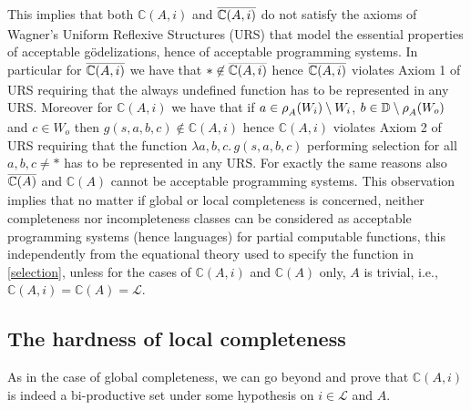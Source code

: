 \documentclass[runningheads]{llncs}
\def\ok#1{\mbox{\raisebox{0ex}[1ex][1ex]{$#1$}}}
\def\bbbc{{\mathbb{C}}}
\newcommand{\ccL}{\mathscr{L}}
\newcommand{\Domain}{\mathbb{D}}
\newcommand{\auco}[2]{\ok{\rho^{#1}_{#2}}}
\newcommand{\compl}[1]{\ok{\overline{#1}}}
\def\ok#1{\mbox{\raisebox{0ex}[1ex][1ex]{$#1$}}}
\def\cAA{\ensuremath{A}}
\begin{document}
This implies that both $\bbbc(\cAA,i)$ and $\compl{\bbbc(\cAA,i)}$ do not satisfy the axioms of Wagner's Uniform Reflexive Structures (URS) \cite{Wagner69} that model the essential properties of acceptable g{\"o}delizations, hence of acceptable programming systems. In particular for $\compl{\bbbc(\cAA,i)}$ we have that $*\not\in \compl{\bbbc(\cAA,i)}$ hence $\compl{\bbbc(\cAA,i)}$ violates Axiom 1 of URS requiring that the always undefined function has to be represented in any URS. Moreover for $\bbbc(\cAA,i)$ we have that if $a\in \auco{}{A}(W_i)\setminus W_i$, $b\in\Domain\setminus\auco{}{A}(W_o)$ and $c\in W_o$ then $g(s,a,b,c)\not\in \bbbc(\cAA,i)$ hence $\bbbc(\cAA,i)$ violates Axiom 2 of URS requiring that the function $\lambda a,b,c.\,g(s,a,b,c)$ performing selection for all $a,b,c\neq *$ has to be represented in any URS. For exactly the same reasons also $\compl{\bbbc(\cAA)}$ and $\bbbc(\cAA)$ cannot be acceptable programming systems. This observation implies that no matter if global or local completeness is concerned, neither completeness nor incompleteness classes can be considered as acceptable programming systems (hence languages) for partial computable functions, this independently from the equational theory used to specify the function in \ref{selection}, unless for the cases of $\bbbc(\cAA,i)$ and $\bbbc(\cAA)$ only, $\cAA$ is  trivial, i.e., $\bbbc(\cAA,i)=\bbbc(\cAA)=\ccL$.



\subsection{The hardness of local completeness}
As in the case of global completeness, we can go beyond and prove that $\bbbc(\cAA,i)$ is indeed a bi-productive set under some hypothesis on $i\in\ccL$ and $\cAA$.
\end{document}
